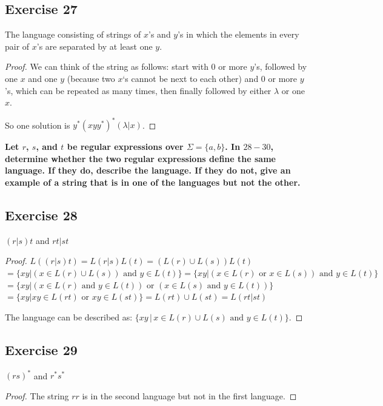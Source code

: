 \documentclass[14pt]{extarticle}
\newcommand{\cy}{\color{cyan}}
\begin{document}
\subsection{Exercise 27}
The language consisting of strings of \(x\)’s and \(y\)’s in which the elements in every pair of \(x\)’s are separated by 
at least one \(y\).

\begin{proof}
We can think of the string as follows: start with 0 or more \(y\)'s, followed by one \(x\) and one \(y\) (because two 
\(x\)`s cannot be next to each other) and 0 or more \(y\)'s,
which can be repeated as many times, then finally followed by
either \(\lambda\) or one \(x\).

So one solution is \(y^*(xyy^*)^*(\lambda | x)\).
\end{proof}

{\bf \cy Let \(r\), \(s\), and \(t\) be regular expressions over \(\Sigma = \{a, b\}\). In \(28-30\), determine whether 
the two regular expressions define the same language. If they do, describe the language. If they do not, give an example of 
a string that is in one of the languages but not the other.}

\subsection{Exercise 28}
\((r | s)t\) and \(rt | st\)

\begin{proof}
\(L((r | s)t) = L(r | s)L(t) = (L(r) \cup L(s))L(t)\) \\
\(= \{xy | (x \in L(r) \cup L(s)) \text{ and } y \in L(t)\}
= \{xy | (x \in L(r) \text{ or } x \in L(s)) \text{ and } y 
\in L(t)\}\) \\
\(= \{xy | (x \in L(r) \text{ and } y \in L(t)) \text{ or } (x \in L(s) \text{ and } y \in L(t))\}\) \\
\(= \{xy | xy \in L(rt) \text{ or } xy \in L(st)\} = L(rt) \cup L(st) = L(rt | st)\)

The language can be described as: \(\{xy \, | \, x \in L(r) \cup L(s) \text{ and } y \in L(t)\}\).
\end{proof}

\subsection{Exercise 29}
\((rs)^*\) and \(r^*s^*\)

\begin{proof}
The string \(rr\) is in the second language but not in the first language.
\end{proof}
\end{document}

